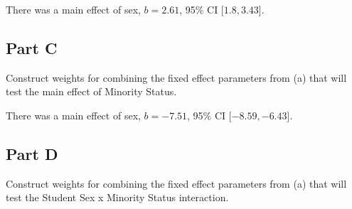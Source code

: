 \documentclass[]{article}
\newenvironment{Shaded}{\begin{snugshade}}{\end{snugshade}}
\newcommand{\KeywordTok}[1]{\textcolor[rgb]{0.13,0.29,0.53}{\textbf{#1}}}
\newcommand{\DataTypeTok}[1]{\textcolor[rgb]{0.13,0.29,0.53}{#1}}
\newcommand{\DecValTok}[1]{\textcolor[rgb]{0.00,0.00,0.81}{#1}}
\newcommand{\StringTok}[1]{\textcolor[rgb]{0.31,0.60,0.02}{#1}}
\newcommand{\OtherTok}[1]{\textcolor[rgb]{0.56,0.35,0.01}{#1}}
\newcommand{\OperatorTok}[1]{\textcolor[rgb]{0.81,0.36,0.00}{\textbf{#1}}}
\newcommand{\NormalTok}[1]{#1}
\begin{document}
There was a main effect of sex, \(b = 2.61\), 95\% CI \([1.8, 3.43\){]}.

\subsection{Part C}\label{part-c}

Construct weights for combining the fixed effect parameters from (a)
that will test the main effect of Minority Status.

\begin{Shaded}
\end{Shaded}

There was a main effect of sex, \(b = -7.51\), 95\% CI
\([-8.59, -6.43\){]}.

\subsection{Part D}\label{part-d}

Construct weights for combining the fixed effect parameters from (a)
that will test the Student Sex x Minority Status interaction.
\end{document}
